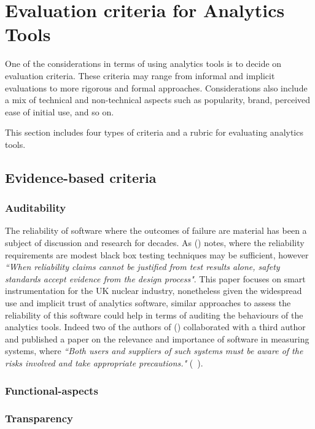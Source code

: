 \section{Evaluation criteria for Analytics Tools}
One of the considerations in terms of using analytics tools is to decide on evaluation criteria. These criteria may range from informal and implicit evaluations to more rigorous and formal approaches. Considerations also include a mix of technical and non-technical aspects such as popularity, brand, perceived ease of initial use, and so on.

This section includes four types of criteria and a rubric for evaluating analytics tools.

\subsection{Evidence-based criteria}

\subsubsection{Auditability}
The reliability of software where the outcomes of failure are material has been a subject of discussion and research for decades. As (\cite{dobbing1998reliability}) notes, where the reliability requirements are modest black box testing techniques may be sufficient, however \emph{``When reliability claims cannot be justified from test results alone, safety standards accept evidence from the design process"}. This paper focuses on smart instrumentation for the UK nuclear industry, nonetheless given the widespread use and implicit trust of analytics software, similar approaches to assess the reliability of this software could help in terms of auditing the behaviours of the analytics tools. Indeed two of the authors of (\cite{dobbing1998reliability}) collaborated with a third author and published a paper on the relevance and importance of software in measuring systems, where \emph{``Both users and suppliers of such systems must be aware of the risks involved and take appropriate precautions."} (~\cite{wichmann2007software}).

\subsubsection{Functional-aspects}

\subsubsection{Transparency}


